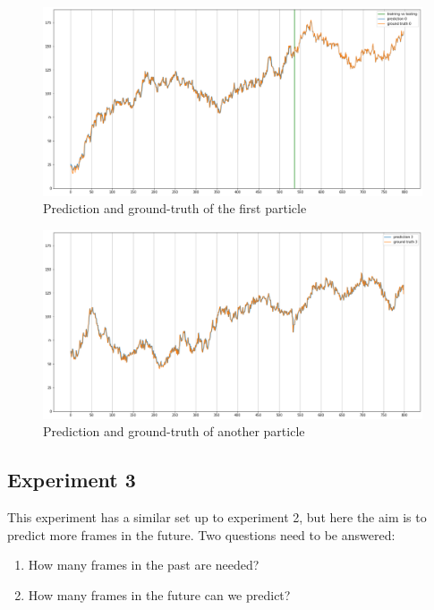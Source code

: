 \documentclass[a4paper]{article}
\begin{document}
  \begin{figure}
    \centering
    \includegraphics[width=\textwidth]{rnn2_plot.png}
    \caption{Prediction and ground-truth of the first particle}
    \label{fig:rnn2_plot}
  \end{figure}

  \begin{figure}
    \centering
    \includegraphics[width=\textwidth]{rnn2_plot_other.png}
    \caption{Prediction and ground-truth of another particle}
    \label{fig:rnn2_plot_other}
  \end{figure}

  \subsection{Experiment 3}
  This experiment has a similar set up to experiment 2, but here the aim is to predict more frames in the future. Two questions need to be answered:

  \begin{enumerate}
    \item How many frames in the past are needed?
    \item How many frames in the future can we predict?
  \end{enumerate}
\end{document}
